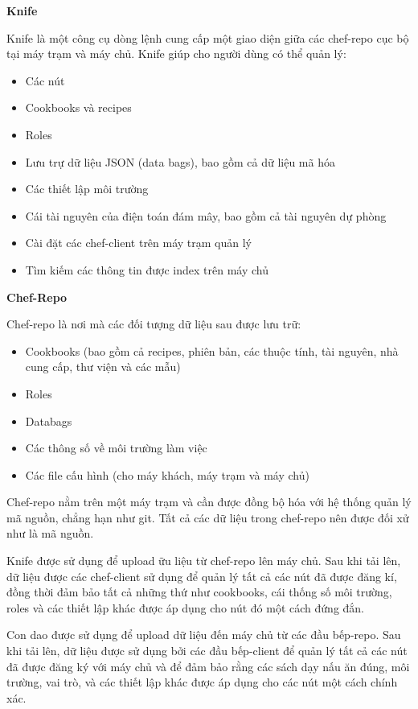 \textbf{\large Knife}

Knife là một công cụ dòng lệnh cung cấp một giao diện giữa các chef-repo cục bộ tại máy trạm và máy chủ. Knife giúp cho người dùng có thể quản lý:

\begin{itemize}
\item Các nút
\item Cookbooks và recipes
\item Roles
\item Lưu trự dữ liệu JSON (data bags), bao gồm cả dữ liệu mã hóa
\item Các thiết lập môi trường
\item Cái tài nguyên của điện toán đám mây, bao gồm cả tài nguyên dự phòng
\item Cài đặt các chef-client trên máy trạm quản lý
\item Tìm kiếm các thông tin được index trên máy chủ
\end{itemize}

\textbf{\large Chef-Repo}

Chef-repo là nơi mà các đối tượng dữ liệu sau được lưu trữ:

\begin{itemize}
\item Cookbooks (bao gồm cả recipes, phiên bản, các thuộc tính, tài nguyên, nhà cung cấp, thư viện và các mẫu)
\item Roles
\item Databags
\item Các thông số về môi trường làm việc
\item Các file cấu hình (cho máy khách, máy trạm và máy chủ)
\end{itemize}

Chef-repo nằm trên một máy trạm và cần được đồng bộ hóa với hệ thống quản lý mã nguồn, chẳng hạn như git. Tất cả các dữ liệu trong chef-repo nên được đối xử như là mã nguồn.

Knife được sử dụng để upload ữu liệu từ chef-repo lên máy chủ. Sau khi tải lên, dữ liệu được các chef-client sử dụng để quản lý tất cả các nút đã được đăng kí, đồng thời đảm bảo tất cả những thứ như cookbooks, cái thống số môi trường, roles và các thiết lập khác được áp dụng cho nút đó một cách đứng đắn.

Con dao được sử dụng để upload dữ liệu đến máy chủ từ các đầu bếp-repo. Sau khi tải lên, dữ liệu được sử dụng bởi các đầu bếp-client để quản lý tất cả các nút đã được đăng ký với máy chủ và để đảm bảo rằng các sách dạy nấu ăn đúng, môi trường, vai trò, và các thiết lập khác được áp dụng cho các nút một cách chính xác.

